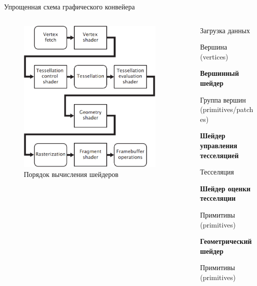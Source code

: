 \documentclass{beamer}
\begin{document}
\begin{frame}{Упрощенная схема графического конвейера}
	\begin{columns}
		\begin{column}{0.5\textwidth}
			\begin{figure}
				\includegraphics[width=0.9\textwidth]{images/Simplified_model_of_the_graphics_pipeline.png}
				\caption{Порядок вычисления шейдеров}
			\end{figure}
		\end{column}
		\begin{column}{0.5\textwidth}

			{\footnotesize

			Загрузка данных

			{\hfill Вершина (vertices)}

			\textbf{Вершинный шейдер}

			{\hfill Группа вершин (primitives/patches)}

			\textbf{Шейдер управления тесселяцией}

			Тесселяция

			\textbf{Шейдер оценки тесселяции}

			{\hfill Примитивы (primitives)}

			\textbf{Геометрический шейдер}

			{\hfill Примитивы (primitives)}

}
\end{column}
\end{columns}
\end{frame}
\end{document}
